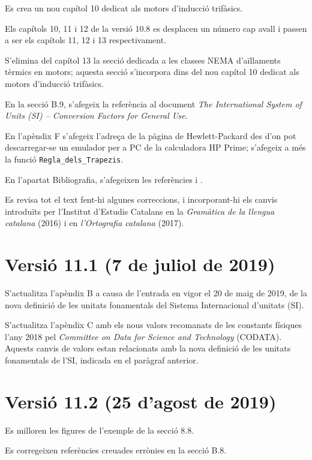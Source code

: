 Es crea un nou capítol 10 dedicat als motors d'inducció trifàsics.

Els capítols 10, 11 i 12 de la versió 10.8 es desplacen un número cap
avall i passen a ser els capítols 11, 12 i 13 respectivament.

S'elimina del capítol 13 la secció dedicada a les classes NEMA d’aïllaments tèrmics en motors; aquesta secció s'incorpora dins del nou capítol 10 dedicat als motors d'inducció trifàsics.

En la secció B.9, s'afegeix la referència al document \textit{The International System of Units (SI) – Conversion Factors for General Use}.

En l'apèndix F s'afegeix l'adreça de la pàgina de Hewlett-Packard des d'on pot descarregar-se un emulador per a PC de la calculadora \textsf{HP Prime}; s'afegeix a més la funció \texttt{Regla\_dels\_Trapezis}.

En l’apartat Bibliografia, s’afegeixen les referències  \cite{JFM} i \cite{WES}.

Es revisa tot el text fent-hi algunes correccions,  i incorporant-hi els canvis introduïts per l’Institut d’Estudis Catalans en la \emph{Gramàtica de la llengua catalana}
(2016) i en \emph{l’Ortografia catalana} (2017).


\section*{Versió 11.1 (7 de juliol de 2019)}

S'actualitza l'apèndix B a causa de l'entrada en vigor el 20 de maig de 2019, de la nova definició de les unitats fonamentals del Sistema Internacional d'unitats (SI).

S'actualitza l'apèndix  C amb els nous valors recomanats de les constants físiques  l'any 2018 pel \textit{Committee on Data for Science and Technology} (CODATA). Aquests canvis de  valors estan  relacionats amb la nova definició de les unitats fonamentals de l'SI, indicada en el paràgraf anterior.

\section*{Versió 11.2 (25 d'agost de 2019)}

Es milloren les figures de l'exemple de la secció 8.8.

Es corregeixen referències creuades errònies en la secció B.8.

